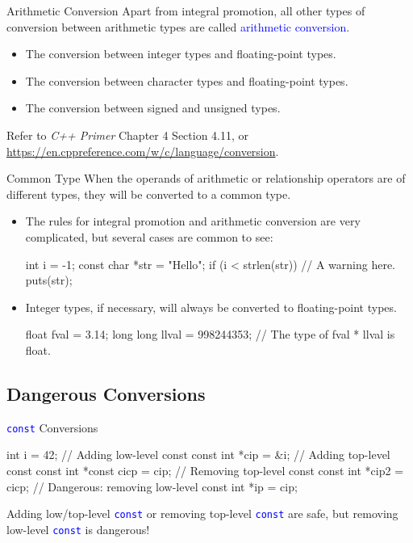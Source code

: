 \documentclass[handout]{beamer}
\newcommand{\blue}[1]{\textcolor{blue}{#1}}
\newcommand{\ttt}[1]{\texttt{#1}}
\newcommand{\bluett}[1]{\blue{\ttt{#1}}}
\theoremstyle{definition}
\begin{document}
\begin{frame}{Arithmetic Conversion}
    Apart from integral promotion, all other types of conversion between arithmetic types are called \blue{arithmetic conversion}.
    \begin{itemize}
        \item The conversion between integer types and floating-point types.
        \item The conversion between character types and floating-point types.
        \item The conversion between signed and unsigned types.
    \end{itemize}
    Refer to \textit{C++ Primer} Chapter 4 Section 4.11, or \url{https://en.cppreference.com/w/c/language/conversion}.
\end{frame}

\begin{frame}[fragile]{Common Type}
    When the operands of arithmetic or relationship operators are of different types, they will be converted to a common type.
    \pause
    \begin{itemize}
        \item The rules for integral promotion and arithmetic conversion are very complicated, but several cases are common to see:
        \begin{cpp}
int i = -1;
const char *str = "Hello";
if (i < strlen(str)) // A warning here.
  puts(str);
        \end{cpp}
        \pause
        \item Integer types, if necessary, will always be converted to floating-point types.
        \begin{cpp}
float fval = 3.14;
long long llval = 998244353;
// The type of fval * llval is float.
        \end{cpp}
    \end{itemize}
\end{frame}

\subsection{Dangerous Conversions}

\begin{frame}[fragile]{\bluett{const} Conversions}
    \begin{cpp}
int i = 42;
// Adding low-level const
const int *cip = &i;
// Adding top-level const
const int *const cicp = cip;
// Removing top-level const
const int *cip2 = cicp;
// Dangerous: removing low-level const
int *ip = cip;
    \end{cpp}
    \pause
    Adding low/top-level \bluett{const} or removing top-level \bluett{const} are safe, but removing low-level \bluett{const} is dangerous!
\end{frame}
\end{document}
